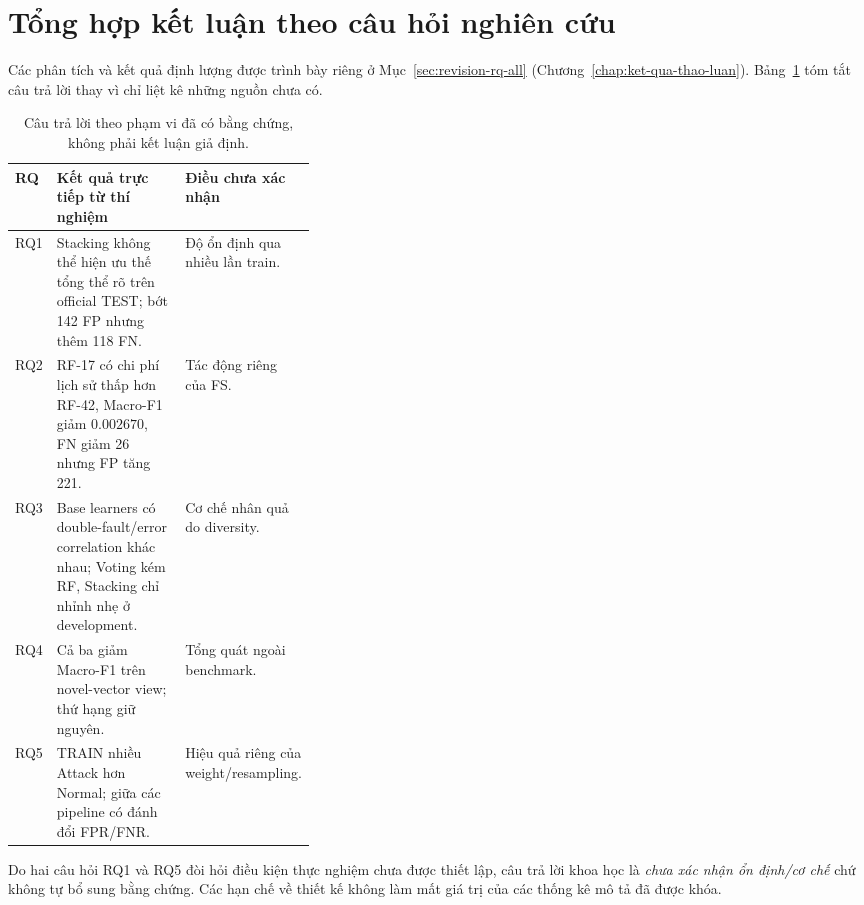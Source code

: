 \section{Tổng hợp kết luận theo câu hỏi nghiên cứu}
\label{sec:revision-rq-map}
Các phân tích và kết quả định lượng được trình bày riêng ở
Mục~\ref{sec:revision-rq-all} (Chương~\ref{chap:ket-qua-thao-luan}).
Bảng~\ref{tab:rq-evidence} tóm tắt câu trả lời thay vì chỉ liệt kê
những nguồn chưa có.

\begin{table}[H]\centering
\small
\caption{Câu trả lời theo phạm vi đã có bằng chứng, không phải kết luận giả định.}
\label{tab:rq-evidence}
\begin{tabularx}{\linewidth}{p{0.12\linewidth}X p{0.23\linewidth}}\toprule
RQ & Kết quả trực tiếp từ thí nghiệm & Điều chưa xác nhận\\\midrule
RQ1 & Stacking không thể hiện ưu thế tổng thể rõ trên official TEST; bớt 142 FP nhưng thêm 118 FN. & Độ ổn định qua nhiều lần train.\\
RQ2 & RF-17 có chi phí lịch sử thấp hơn RF-42, Macro-F1 giảm $0.002670$, FN giảm 26 nhưng FP tăng 221. & Tác động riêng của FS.\\
RQ3 & Base learners có double-fault/error correlation khác nhau; Voting kém RF, Stacking chỉ nhỉnh nhẹ ở development. & Cơ chế nhân quả do diversity.\\
RQ4 & Cả ba giảm Macro-F1 trên novel-vector view; thứ hạng giữ nguyên. & Tổng quát ngoài benchmark.\\
RQ5 & TRAIN nhiều Attack hơn Normal; giữa các pipeline có đánh đổi FPR/FNR. & Hiệu quả riêng của weight/resampling.\\\bottomrule
\end{tabularx}
\end{table}

Do hai câu hỏi RQ1 và RQ5 đòi hỏi điều kiện thực nghiệm chưa được thiết lập, câu trả lời khoa học là \emph{chưa xác nhận ổn định/cơ chế} chứ không tự bổ sung bằng chứng. Các hạn chế về thiết kế không làm mất giá trị của các thống kê mô tả đã được khóa.
